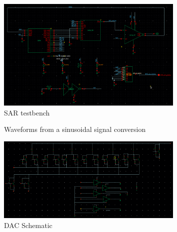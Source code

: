 \documentclass{article}
\begin{document}
 \begin{figure}[h]
  \centering
  \includegraphics[width=0.8\textwidth]{./img/m3_schematic}
  \caption{SAR testbench}
  \label{fig:sar_tb}
 \end{figure}

 \begin{figure}[h]
  \centering
  
  \caption{Waveforms from a sinusoidal signal conversion}
  \label{fig:sinusoidal-conversion}
 \end{figure}

 \begin{figure}[h]
  \centering
  \includegraphics[width=0.8\textwidth]{./img/m3_sar}
  \caption{DAC Schematic}
  \label{fig:dac}
 \end{figure}
\end{document}
